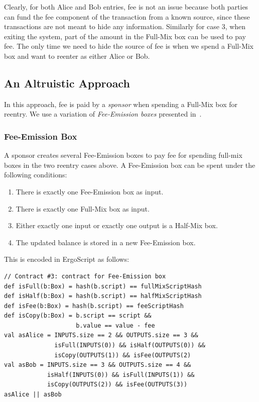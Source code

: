 \documentclass[runningheads]{llncs}
\newcommand{\langname}{ErgoScript\xspace}
\begin{document}
Clearly, for both Alice and Bob entries, fee is not an issue because both parties can fund the fee component of the transaction from a known source, since these transactions are not meant to hide any information. Similarly for case 3, when exiting the system, part of the amount in the Full-Mix box can be used to pay fee. The only time we need to hide the source of fee is when we spend a Full-Mix box and want to reenter as either Alice or Bob. 

\subsection{An Altruistic Approach}
\label{donation}

In this approach, fee is paid by a {\em sponsor} when spending a Full-Mix box for reentry. 
We use a variation of {\em Fee-Emission boxes} presented in~\cite{Fee-Emission}. 

\subsubsection{Fee-Emission Box}
A sponsor creates several Fee-Emission boxes to pay fee for spending full-mix boxes in the two reentry cases above. A Fee-Emission box can be spent under the following conditions:

\begin{enumerate}
    \item There is exactly one Fee-Emission box as input.
    \item There is exactly one Full-Mix box as input.
    \item Either exactly one input or exactly one output is a Half-Mix box.
    \item The updated balance is stored in a new Fee-Emission box.
\end{enumerate}

This is encoded in \langname as follows:

{\small
\begin{Verbatim}[frame=single]
// Contract #3: contract for Fee-Emission box
def isFull(b:Box) = hash(b.script) == fullMixScriptHash 
def isHalf(b:Box) = hash(b.script) == halfMixScriptHash
def isFee(b:Box) = hash(b.script) == feeScriptHash
def isCopy(b:Box) = b.script == script && 
                    b.value == value - fee
val asAlice = INPUTS.size == 2 && OUTPUTS.size == 3 &&
              isFull(INPUTS(0)) && isHalf(OUTPUTS(0)) &&
              isCopy(OUTPUTS(1)) && isFee(OUTPUTS(2)
val asBob = INPUTS.size == 3 && OUTPUTS.size == 4 &&
            isHalf(INPUTS(0)) && isFull(INPUTS(1)) &&
            isCopy(OUTPUTS(2)) && isFee(OUTPUTS(3))
asAlice || asBob 
\end{Verbatim}
}
\end{document}
